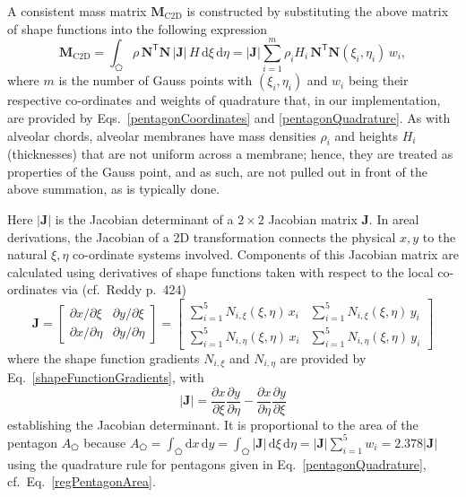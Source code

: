 A consistent mass matrix $\mathbf{M}_{\mathrm{C2D}}$ is constructed by substituting the above matrix of shape functions into the following expression
\begin{equation}
    \mathbf{M}_{\mathrm{C2D}} = \int_{\pentagon} \rho \, \mathbf{N}^{\mathsf{T}} \mathbf{N} \,|\mathbf{J}| \, H \, \mathrm{d} \xi \, \mathrm{d} \eta 
    = | \mathbf{J} | \sum_{i=1}^m \rho_i H_i \, \mathbf{N}^{\mathsf{T}} \mathbf{N} 
    (\xi_i , \eta_i) \, w_i ,
    \label{massintegral2d}
\end{equation}
where $m$ is the number of Gauss points with $( \xi_i , \eta_i )$ and $w_i$ being their respective co-ordinates and weights of quadrature that, in our implementation, are provided by Eqs.~\ref{pentagonCoordinates} and \ref{pentagonQuadrature}.  As with alveolar chords, alveolar membranes have mass densities $\rho_i$ and heights $H_i$ (thicknesses) that are not uniform across a membrane; hence, they are treated as properties of the Gauss point, and as such, are not pulled out in front of the above summation, as is typically done.

Here $|\mathbf{J}|$ is the Jacobian determinant of a $2 \! \times \! 2$ Jacobian matrix $\mathbf{J}$.  In areal derivations, the Jacobian of a 2D transformation connects the physical ${x, y}$ to the natural ${\xi, \eta}$ co-ordinate systems involved.  Components of this Jacobian matrix are calculated using derivatives of shape functions taken with respect to the local co-ordinates via (cf.\ Reddy \cite{Reddy93} p.~424)
\begin{equation}
\mathbf{J} = 
\begin{bmatrix}
\partial x / \partial\xi & \partial y / \partial\xi \\
\partial x / \partial\eta & \partial y / \partial\eta 
\end{bmatrix}  
= \begin{bmatrix}
\sum\nolimits_{i=1}^5 N_{i,\xi} (\xi,\eta) \, x_i & \sum\nolimits_{i=1}^5 N_{i,\xi} (\xi,\eta) \, y_i \\
\sum\nolimits_{i=1}^5 N_{i,\eta} (\xi,\eta) \, x_i & \sum\nolimits_{i=1}^5 N_{i,\eta} (\xi,\eta) \, y_i
\end{bmatrix}
\label{jacobian2D}
\end{equation}
where the shape function gradients $N_{i,\xi}$ and $N_{i,\eta}$ are provided by Eq.~\ref{shapeFunctionGradients}, with
\begin{equation}
| \mathbf{J} | = \frac{\partial x}{\partial \xi} \frac{\partial y}{\partial \eta} - 
\frac{\partial x}{\partial \eta} \frac{\partial y}{\partial \xi}
\label{jacobianpent}
\end{equation}
establishing the Jacobian determinant.  It is proportional to the area of the pentagon $A_{\pentagon}$ because $A_{\pentagon} = \int_{\pentagon} \mathrm{d}x \, \mathrm{d}y = \int_{\pentagon} | \mathbf{J} | \, \mathrm{d}\xi \, \mathrm{d}\eta = | \mathbf{J} | \sum_{i=1}^5 w_i = 2.378 | \mathbf{J} |$ using the quadrature rule for pentagons given in Eq.~\ref{pentagonQuadrature}, cf.\ Eq.~\ref{regPentagonArea}.

